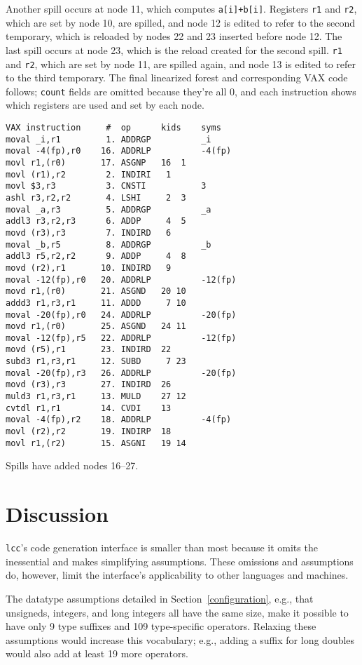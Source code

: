 Another spill occurs at node 11, which computes \verb|a[i]+b[i]|.
Registers \verb|r1| and \verb|r2|, which are set by node 10, are spilled,
and node 12 is edited to refer to the second temporary, which is reloaded
by nodes 22 and 23 inserted before node 12.
The last spill occurs at node 23, which is the reload
created for the second spill. \verb|r1| and \verb|r2|, which are
set by node 11, are spilled again, and node 13 is edited
to refer to the third temporary.
The final linearized forest and corresponding VAX code follows;
\verb|count| fields are omitted because they're all 0,
and each instruction shows which registers are used and set by each node.
\begin{verbatim}
VAX instruction     #  op      kids    syms
moval _i,r1         1. ADDRGP          _i
moval -4(fp),r0    16. ADDRLP          -4(fp)
movl r1,(r0)       17. ASGNP   16  1
movl (r1),r2        2. INDIRI   1
movl $3,r3          3. CNSTI           3
ashl r3,r2,r2       4. LSHI     2  3
moval _a,r3         5. ADDRGP          _a
addl3 r3,r2,r3      6. ADDP     4  5
movd (r3),r3        7. INDIRD   6
moval _b,r5         8. ADDRGP          _b
addl3 r5,r2,r2      9. ADDP     4  8
movd (r2),r1       10. INDIRD   9
moval -12(fp),r0   20. ADDRLP          -12(fp)
movd r1,(r0)       21. ASGND   20 10
addd3 r1,r3,r1     11. ADDD     7 10
moval -20(fp),r0   24. ADDRLP          -20(fp)
movd r1,(r0)       25. ASGND   24 11
moval -12(fp),r5   22. ADDRLP          -12(fp)
movd (r5),r1       23. INDIRD  22
subd3 r1,r3,r1     12. SUBD     7 23
moval -20(fp),r3   26. ADDRLP          -20(fp)
movd (r3),r3       27. INDIRD  26
muld3 r1,r3,r1     13. MULD    27 12
cvtdl r1,r1        14. CVDI    13
moval -4(fp),r2    18. ADDRLP          -4(fp)
movl (r2),r2       19. INDIRP  18
movl r1,(r2)       15. ASGNI   19 14
\end{verbatim}
Spills have added nodes 16--27.


\section{Discussion}

\verb|lcc|'s code generation interface is smaller than most
because it omits the inessential and makes simplifying assumptions.
These omissions and assumptions do, however,
limit the interface's applicability to other languages and machines.

The datatype assumptions detailed in Section~\ref{configuration},
e.g., that unsigneds, integers, and long integers all have the same size,
make it possible to have only 9 type suffixes and 109 type-specific operators.
Relaxing these assumptions would increase this vocabulary;
e.g., adding a suffix for long doubles would also add at least
19 more operators.

